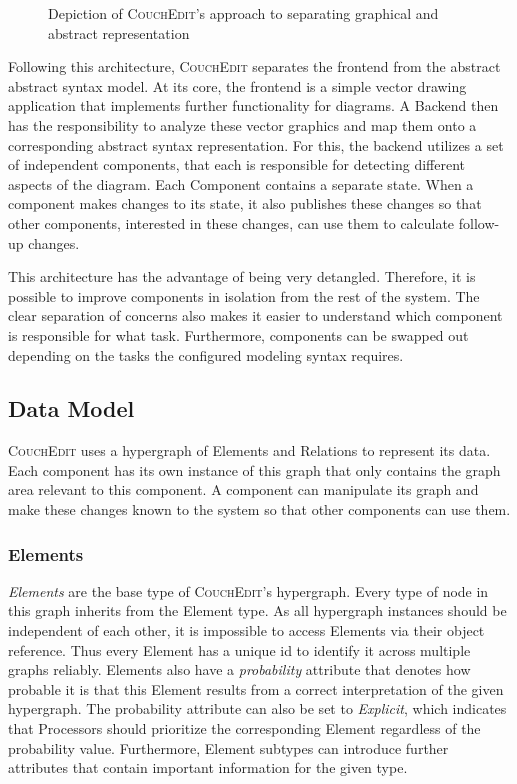 \begin{figure}
  \centering
  
  \caption{Depiction of \textsc{CouchEdit}'s approach to separating graphical and abstract representation}
  \label{fig:transmm}
  \end{figure}

Following this architecture, \textsc{CouchEdit} separates the frontend from the abstract abstract syntax model. At its core, the frontend is a simple vector drawing application that implements further functionality for diagrams. A Backend then has the responsibility to analyze these vector graphics and map them onto a corresponding abstract syntax representation. For this, the backend utilizes a set of independent components, that each is responsible for detecting different aspects of the diagram. Each Component contains a separate state. When a component makes changes to its state, it also publishes these changes so that other components, interested in these changes, can use them to calculate follow-up changes.  

This architecture has the advantage of being very detangled. Therefore, it is possible to improve components in isolation from the rest of the system. The clear separation of concerns also makes it easier to understand which component is responsible for what task. Furthermore, components can be swapped out depending on the tasks the configured modeling syntax requires.



\subsection{Data Model}
\textsc{CouchEdit} uses a hypergraph of Elements and Relations to represent its data. Each component has its own instance of this graph that only contains the graph area relevant to this component. A component can manipulate its graph and make these changes known to the system so that other components can use them.


\subsubsection{Elements}
\emph{Elements} are the base type of \textsc{CouchEdit}'s hypergraph. Every type of node in this graph inherits from the Element type. As all hypergraph instances should be independent of each other, it is impossible to access Elements via their object reference. Thus every Element has a unique id to identify it across multiple graphs reliably. Elements also have a \emph{probability} attribute that denotes how probable it is that this Element results from a correct interpretation of the given hypergraph. The probability attribute can also be set to \emph{Explicit}, which indicates that Processors should prioritize the corresponding Element regardless of the probability value. Furthermore, Element subtypes can introduce further attributes that contain important information for the given type.


